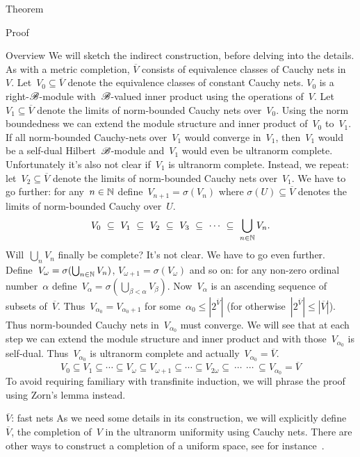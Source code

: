 \documentclass[b]{subfiles}
\begin{document}
\begin{parsec}
\begin{point}{Theorem}
\begin{point}{Proof}
\begin{point}{Overview}
We will sketch the indirect construction,
    before delving into the details.
As with a metric completion,
    $\overline{V}$ consists of equivalence classes of Cauchy nets in~$V$.
Let~$V_0\subseteq \overline{V}$
    denote the equivalence classes of constant Cauchy nets.
$V_0$ is a right-$\mathscr{B}$-module with~$\mathscr{B}$-valued inner product
    using the operations of~$V$.
Let~$V_1\subseteq \overline{V}$ denote
    the limits of norm-bounded Cauchy nets over~$V_0$.
Using the norm boundedness we can extend
    the module structure and inner product of~$V_0$ to~$V_1$.
If all norm-bounded Cauchy-nets over~$V_1$ would
    converge in~$V_1$,
    then~$V_1$ would be a self-dual Hilbert~$\mathscr{B}$-module
    and~$V_1$ would even be ultranorm complete.
Unfortunately it's also not clear if~$V_1$ is ultranorm complete.
Instead, we repeat: let~$V_2 \subseteq \overline{V}$
    denote the limits of norm-bounded Cauchy nets over~$V_1$.
We have to go further:
    for any~$n \in \mathbb{N}$
    define~$V_{n+1} = \sigma(V_n)$
    where $\sigma(U)\subseteq \overline{V}$
    denotes the limits of norm-bounded Cauchy over~$U$.
\begin{equation*}
   V_0 \ \subseteq \ V_1 \ \subseteq\  V_2\  \subseteq\  V_3 \ \subseteq \ \cdots\ \subseteq \ \bigcup_{n \in \N} V_n.
\end{equation*}
Will~$\bigcup_n V_n$ finally be complete?
It's not clear.
We have to go even further.
Define~$V_\omega = \sigma(\bigcup_{n \in \mathbb{N}} V_n)$,
$V_{\omega+1} = \sigma(V_\omega)$
and so on:
for any non-zero ordinal number~$\alpha$
    define~$V_\alpha = \sigma(\bigcup_{\beta < \alpha} V_\beta)$.
Now~$V_\alpha$
    is an ascending sequence of subsets of~$\overline{V}$.
    Thus~$V_{\alpha_0} = V_{{\alpha_0}+1}$
for some~$\alpha_0 \leq |2^{\overline{V}}|$
(for otherwise~$|2^{\overline{V}}| \leq |\overline{V}|$).
Thus norm-bounded Cauchy nets in~$V_{\alpha_0}$
    must converge.
We will see that at each step we can extend the module structure
    and inner product and with those~$V_{\alpha_0}$ is self-dual.
    Thus~$V_{\alpha_0}$ is ultranorm complete
    and actually~$V_{\alpha_0} = \overline{V}$.
\begin{equation*}
   V_0 \subseteq V_1 \subseteq \cdots \subseteq V_\omega \subseteq
   V_{\omega+1} \subseteq \cdots \subseteq V_{2\omega} \subseteq
       \ \cdots\ 
       \ \cdots\  \subseteq
   V_{\alpha_0} = \overline{V}
\end{equation*}
To avoid requiring familiary with transfinite induction,
    we will phrase the proof using Zorn's lemma instead.
\end{point}
\begin{point}{$\overline{V}$: fast nets}%
As we need some details in its construction,
    we will explicitly define~$\overline{V}$,
    the completion of~$V$ in the ultranorm uniformity
    using Cauchy nets.
There are other ways to construct a completion of a uniform space,
    see for instance~\cite[Thm.~39.12]{willard}.


\end{point}
\end{point}
\end{point}
\end{parsec}
\end{document}
